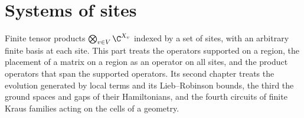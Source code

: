 \part{Systems of sites}
\label{part:sites}

Finite tensor products $\bigotimes_{v\in V}\C^{X_v}$ indexed by a set of sites,
with an arbitrary finite basis at each site. This part treats the operators
supported on a region, the placement of a matrix on a region as an operator on
all sites, and the product operators that span the supported operators. Its
second chapter treats the evolution generated by local terms and its
Lieb--Robinson bounds, the third the ground spaces and gaps of their
Hamiltonians, and the fourth circuits of finite Kraus families acting on the
cells of a geometry.
